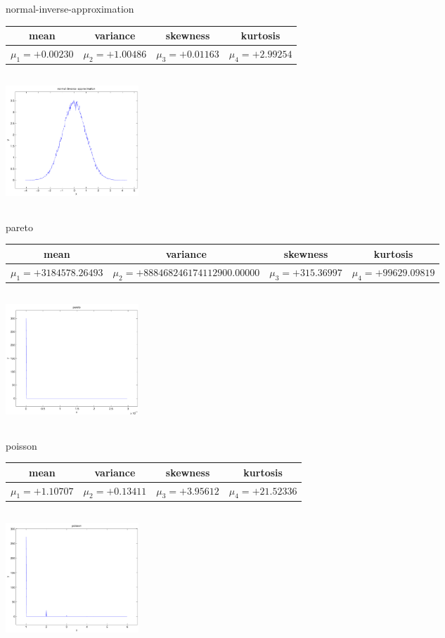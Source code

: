 \documentclass[9pt]{article}
\theoremstyle{plain}
\theoremstyle{definition}
\theoremstyle{remark}
\numberwithin{equation}{section}
\begin{document}
\newpage
normal-inverse-approximation \begin{tabular}{|c|c|c|c|}  mean & variance & skewness & kurtosis \\  \hline
$\mu_1 = +0.00230$ & $\mu_2 = +1.00486$ & $\mu_3 = +0.01163$ & $\mu_4 =+2.99254$ \\
\end{tabular}

\includegraphics[width=5cm,height=5cm]{normal-inverse-approximation.pdf}

pareto \begin{tabular}{|c|c|c|c|}  mean & variance & skewness & kurtosis \\  \hline
$\mu_1 = +3184578.26493$ & $\mu_2 = +888468246174112900.00000$ & $\mu_3 = +315.36997$ & $\mu_4 =+99629.09819$ \\
\end{tabular}

\includegraphics[width=5cm,height=5cm]{pareto.pdf}

poisson \begin{tabular}{|c|c|c|c|}  mean & variance & skewness & kurtosis \\  \hline
$\mu_1 = +1.10707$ & $\mu_2 = +0.13411$ & $\mu_3 = +3.95612$ & $\mu_4 =+21.52336$ \\
\end{tabular}

\includegraphics[width=5cm,height=5cm]{poisson.pdf}
\end{document}
